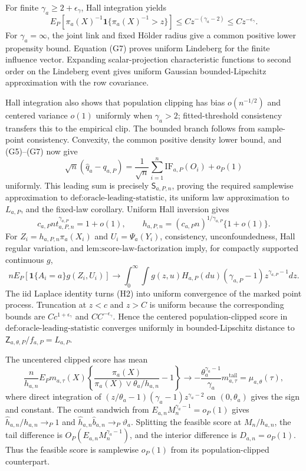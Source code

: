 For finite \(\gamma_a\ge2+\epsilon_\gamma\), Hall integration yields
\[
 E_P\!\left[\pi_a(X)^{-1}\mathbf1\{\pi_a(X)^{-1}>z\}\right]
 \le Cz^{-(\gamma_a-2)}\le Cz^{-\epsilon_\gamma}.
\tag{G7}
\]
For \(\gamma_a=\infty\), the joint link and fixed Hölder radius give a common positive lower propensity bound.  Equation (G7) proves uniform Lindeberg for the finite influence vector.  Expanding scalar-projection characteristic functions to second order on the Lindeberg event gives uniform Gaussian bounded-Lipschitz approximation with the row covariance.

Hall integration also shows that population clipping has bias \(o(n^{-1/2})\) and centered variance \(o(1)\) uniformly when \(\gamma_a>2\); fitted-threshold consistency transfers this to the empirical clip.  The bounded branch follows from sample-point consistency.  Convexity, the common positive density lower bound, and (G5)--(G7) now give
\[
 \sqrt n(\widehat q_a-q_{a,P})
 =\frac1{\sqrt n}\sum_{i=1}^n\mathrm{IF}_{a,P}(O_i)+o_P(1)
\]
uniformly.  This leading sum is precisely \(\mathsf S_{a,P,n}\), proving the required samplewise approximation to \(\text{def:oracle-leading-statistic}\), its uniform law approximation to \(L_{a,P}\), and the fixed-law corollary.
Uniform Hall inversion gives
\[
 c_{a,P}nt_{a,P,n}^{\gamma_{a,P}}=1+o(1),
 \qquad h_{a,P,n}=(c_{a,P}n)^{1/\gamma_{a,P}}\{1+o(1)\}.
\tag{H1}
\]
For \(Z_i=h_{a,P,n}\pi_a(X_i)\) and \(U_i=\Psi_a(Y_i)\), consistency, unconfoundedness, Hall regular variation, and \(\text{lem:score-law-factorization}\) imply, for compactly supported continuous \(g\),
\[
 nE_P[\mathbf1\{A_i=a\}g(Z_i,U_i)]
 \to\int_0^\infty\int g(z,u)H_{a,P}(du)(\gamma_{a,P}-1)z^{\gamma_{a,P}-1}dz.
\tag{H2}
\]
The iid Laplace identity turns (H2) into uniform convergence of the marked point process.  Truncation at \(z<c\) and \(z>C\) is uniform because the corresponding bounds are \(Cc^{1+\epsilon_\gamma}\) and \(CC^{-\epsilon_\gamma}\).  Hence the centered population-clipped score in \(\text{def:oracle-leading-statistic}\) converges uniformly in bounded-Lipschitz distance to \(\mathsf Z_{a,\theta,P}/f_{a,P}=L_{a,P}\).

The uncentered clipped score has mean
\[
 \frac n{h_{a,n}}E_Pm_{a,\tau}(X)
 \left\{\frac{\pi_a(X)}{\pi_a(X)\vee\theta_a/h_{a,n}}-1\right\}
 \to-\frac{\theta_a^{\gamma_a-1}}{\gamma_a}m^{\mathrm{tail}}_{a,\tau}
 =\mu_{a,\theta}(\tau),
\tag{H3}
\]
where direct integration of \((z/\theta_a-1)(\gamma_a-1)z^{\gamma_a-2}\) on \((0,\theta_a)\) gives the sign and constant.  The count sandwich from \(E_{a,n}M_n^{\gamma_a-1}=o_P(1)\) gives \(\widehat h_{a,n}/h_{a,n}\to_P1\) and \(\widehat h_{a,n}\widehat b_{a,n}\to_P\vartheta_a\).  Splitting the feasible score at \(M_n/h_{a,n}\), the tail difference is \(O_P(E_{a,n}M_n^{\gamma_a-1})\), and the interior difference is \(D_{a,n}=o_P(1)\).  Thus the feasible score is samplewise \(o_P(1)\) from its population-clipped counterpart.


